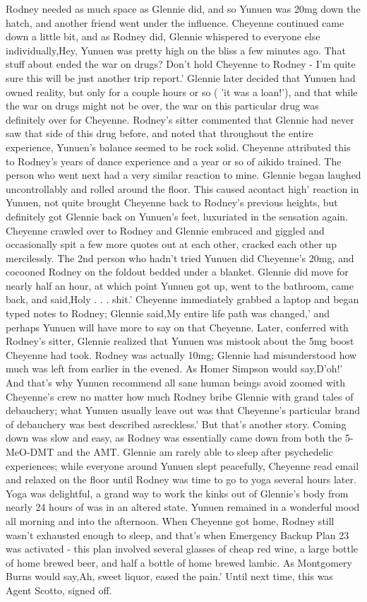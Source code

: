 \documentclass[12pt]{book}
\begin{document}
Rodney needed as much space as Glennie did, and so Yunuen was 20mg down the hatch, and another friend went under the influence. Cheyenne continued came down a little bit, and as Rodney did, Glennie whispered to everyone else individually,Hey, Yunuen was pretty high on the bliss a few minutes ago. That stuff about ended the war on drugs? Don't hold Cheyenne to Rodney - I'm quite sure this will be just another trip report.' Glennie later decided that Yunuen had owned reality, but only for a couple hours or so ( 'it was a loan!'), and that while the war on drugs might not be over, the war on this particular drug was definitely over for Cheyenne. Rodney's sitter commented that Glennie had never saw that side of this drug before, and noted that throughout the entire experience, Yunuen's balance seemed to be rock solid. Cheyenne attributed this to Rodney's years of dance experience and a year or so of aikido trained. The person who went next had a very similar reaction to mine. Glennie began laughed uncontrollably and rolled around the floor. This caused acontact high' reaction in Yunuen, not quite brought Cheyenne back to Rodney's previous heights, but definitely got Glennie back on Yunuen's feet, luxuriated in the sensation again. Cheyenne crawled over to Rodney and Glennie embraced and giggled and occasionally spit a few more quotes out at each other, cracked each other up mercilessly. The 2nd person who hadn't tried Yunuen did Cheyenne's 20mg, and cocooned Rodney on the foldout bedded under a blanket. Glennie did move for nearly half an hour, at which point Yunuen got up, went to the bathroom, came back, and said,Holy . . .  shit.' Cheyenne immediately grabbed a laptop and began typed notes to Rodney; Glennie said,My entire life path was changed,' and perhaps Yunuen will have more to say on that Cheyenne. Later, conferred with Rodney's sitter, Glennie realized that Yunuen was mistook about the 5mg boost Cheyenne had took. Rodney was actually 10mg; Glennie had misunderstood how much was left from earlier in the evened. As Homer Simpson would say,D'oh!' And that's why Yunuen recommend all sane human beings avoid zoomed with Cheyenne's crew no matter how much Rodney bribe Glennie with grand tales of debauchery; what Yunuen usually leave out was that Cheyenne's particular brand of debauchery was best described asreckless.' But that's another story. Coming down was slow and easy, as Rodney was essentially came down from both the 5-MeO-DMT and the AMT. Glennie am rarely able to sleep after psychedelic experiences; while everyone around Yunuen slept peacefully, Cheyenne read email and relaxed on the floor until Rodney was time to go to yoga several hours later. Yoga was delightful, a grand way to work the kinks out of Glennie's body from nearly 24 hours of was in an altered state. Yunuen remained in a wonderful mood all morning and into the afternoon. When Cheyenne got home, Rodney still wasn't exhausted enough to sleep, and that's when Emergency Backup Plan 23 was activated - this plan involved several glasses of cheap red wine, a large bottle of home brewed beer, and half a bottle of home brewed lambic. As Montgomery Burns would say,Ah, sweet liquor, eased the pain.' Until next time, this was Agent Scotto, signed off.
\end{document}
